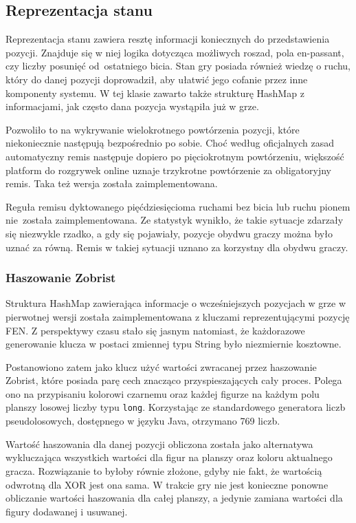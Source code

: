 \subsection{Reprezentacja stanu}
\label{subsec:reprezentacja-stanu}

Reprezentacja stanu zawiera resztę informacji koniecznych do przedstawienia pozycji.
Znajduje się w niej logika dotycząca możliwych roszad, pola en-passant, czy liczby posunięć od~ostatniego bicia.
Stan gry posiada również wiedzę o ruchu, który do danej pozycji doprowadził, aby ułatwić jego cofanie przez inne komponenty systemu.
W tej klasie zawarto także strukturę HashMap z informacjami, jak często dana pozycja wystąpiła już w grze.

Pozwoliło to na wykrywanie wielokrotnego powtórzenia pozycji, które niekoniecznie następują bezpośrednio po sobie.
Choć według oficjalnych zasad automatyczny remis następuje dopiero po pięciokrotnym powtórzeniu, większość platform do rozgrywek online uznaje trzykrotne powtórzenie za obligatoryjny remis.
Taka też wersja została zaimplementowana.

Reguła remisu dyktowanego pięćdziesięcioma ruchami bez bicia lub ruchu pionem nie~została zaimplementowana.
Ze statystyk wynikło, że takie sytuacje zdarzały się niezwykle rzadko, a gdy się pojawiały, pozycje obydwu graczy można było uznać za równą.
Remis w takiej sytuacji uznano za korzystny dla obydwu graczy.

\subsubsection{Haszowanie Zobrist}
Struktura HashMap zawierająca informacje o wcześniejszych pozycjach w grze w pierwotnej wersji została zaimplementowana z kluczami reprezentującymi pozycję FEN.
Z perspektywy czasu stało się jasnym natomiast, że każdorazowe generowanie klucza w postaci zmiennej typu String było niezmiernie kosztowne.

Postanowiono zatem jako klucz użyć wartości zwracanej przez haszowanie Zobrist, które posiada parę cech znacząco przyspieszających cały proces.
Polega ono na przypisaniu kolorowi czarnemu oraz każdej figurze na każdym polu planszy losowej liczby typu \texttt{long}.
Korzystając ze standardowego generatora liczb pseudolosowych, dostępnego w języku Java, otrzymano 769 liczb.

Wartość haszowania dla danej pozycji obliczona została jako alternatywa wykluczająca wszystkich wartości dla figur na planszy oraz koloru aktualnego gracza.
Rozwiązanie to byłoby równie złożone, gdyby nie fakt, że wartością odwrotną dla XOR jest ona sama.
W trakcie gry nie jest konieczne ponowne obliczanie wartości haszowania dla całej planszy, a jedynie zamiana wartości dla figury dodawanej i usuwanej.

